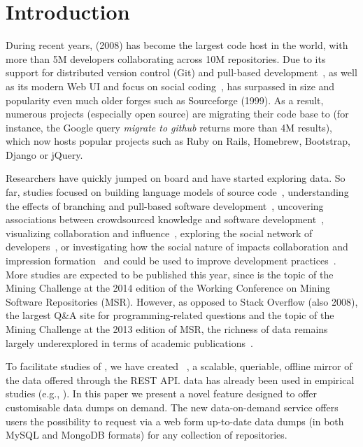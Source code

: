 
\section{Introduction}
\label{sec:intro}

During recent years, \gh (2008) has become the largest code host in the world, with more than 5M developers
collaborating across 10M repositories.
Due to its support for distributed version control (Git) and pull-based development~\cite{barr2012cohesive},
as well as its modern Web UI and focus on social coding~\cite{dabbish2012social}, \gh has surpassed in size
and popularity even much older forges such as Sourceforge (1999).
As a result, numerous projects (especially open source) are migrating their code base to \gh (for instance,
the Google query \emph{migrate to github} returns more than 4M results), which now hosts popular projects
such as Ruby on Rails, Homebrew, Bootstrap, Django or jQuery.

Researchers have quickly jumped on board and have started exploring \gh data.
So far, studies focused on
building language models of source code~\cite{allamanis2013mining},
understanding the effects of branching and pull-based software development~\cite{lee2013git, gousios2014exploratory},
uncovering associations between crowdsourced knowledge and software development~\cite{vasilescu2013stackoverflow},
visualizing collaboration and influence~\cite{heller2011visualizing},
exploring the social network of developers~\cite{thung2013network, schall2013follow, jiang2013understanding},
or investigating how the social nature of \gh impacts collaboration and impression formation~\cite{dabbish2012social, marlow2013impression}
and could be used to improve development practices~\cite{pham2013creating, pham2013building}.
More studies are expected to be published this year, since \gh is the topic of the Mining Challenge
at the 2014 edition of the Working Conference on Mining Software Repositories (MSR).
However, as opposed to Stack Overflow (also 2008), the largest Q\&A site for programming-related questions
and the topic of the Mining Challenge at the 2013 edition of MSR, the richness of \gh data remains
largely underexplored in terms of academic publications~\cite{vasilescu2012meta}.

To facilitate studies of \gh, we have created \ght~\cite{gousios2012ghtorent}, %
a scalable,
queriable, offline mirror of the data offered through the \gh REST API.
\ght data has already been used in empirical studies (e.g., \cite{gousios2014exploratory, squire2014forge,
vasilescu2013stackoverflow}).
In this paper we present a novel feature designed to offer customisable data dumps on demand.
The new \ght data-on-demand service offers users the possibility to request via a web form up-to-date \ght
data dumps (in both MySQL and MongoDB formats) for any collection of \gh repositories.

